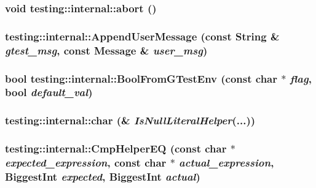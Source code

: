 \subsubsection{\setlength{\rightskip}{0pt plus 5cm}void testing::internal::abort ()\hspace{0.3cm}{\tt  [inline]}}\label{namespacetesting_1_1internal_4745413dab28201711f46860bdf5f8df}


\subsubsection{ testing::internal::AppendUserMessage (const String \& {\em gtest\_\-msg}, const Message \& {\em user\_\-msg})}\label{namespacetesting_1_1internal_901d0ae5e90567e51c455733e1e5da8d}


\subsubsection{\setlength{\rightskip}{0pt plus 5cm}bool testing::internal::BoolFromGTestEnv (const char $\ast$ {\em flag}, bool {\em default\_\-val})}\label{namespacetesting_1_1internal_448cba1f8ab67d66b52629959993c621}


\subsubsection{\setlength{\rightskip}{0pt plus 5cm}testing::internal::char (\& {\em IsNullLiteralHelper}(...))}\label{namespacetesting_1_1internal_661d333b5616fc0c8ce290d86730a7f3}


\subsubsection{ testing::internal::CmpHelperEQ (const char $\ast$ {\em expected\_\-expression}, const char $\ast$ {\em actual\_\-expression}, BiggestInt {\em expected}, BiggestInt {\em actual})}\label{namespacetesting_1_1internal_6d1c68524ae5a0abc96b53ac94bcba19}


